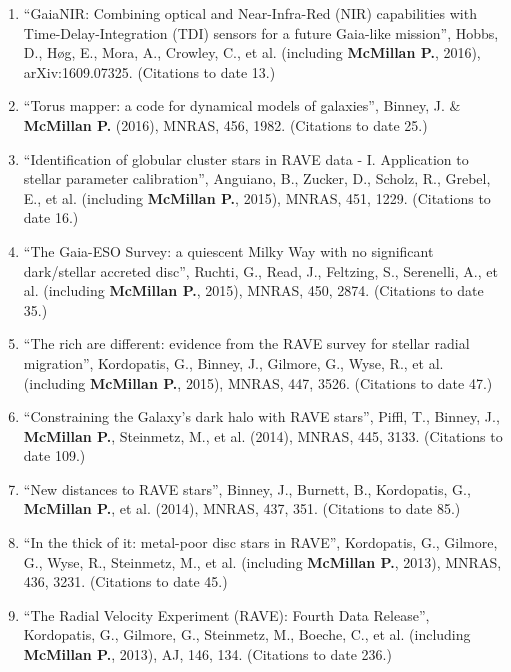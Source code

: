 \documentclass{resume}
\begin{document}
\begin{enumerate}
\item ``GaiaNIR: Combining optical and Near-Infra-Red (NIR) capabilities with Time-Delay-Integration (TDI) sensors for a future Gaia-like mission'', Hobbs, D., H{\o}g, E., Mora, A., Crowley, C., et al. (including \textbf{McMillan P.}, 2016), arXiv:1609.07325. (Citations to date 13.)

\item ``Torus mapper: a code for dynamical models of galaxies'', Binney, J. \& \textbf{McMillan P.} (2016), MNRAS, 456, 1982. (Citations to date 25.)

\item ``Identification of globular cluster stars in RAVE data - I. Application to stellar parameter calibration'', Anguiano, B., Zucker, D., Scholz, R., Grebel, E., et al. (including \textbf{McMillan P.}, 2015), MNRAS, 451, 1229. (Citations to date 16.)

\item ``The Gaia-ESO Survey: a quiescent Milky Way with no significant dark/stellar accreted disc'', Ruchti, G., Read, J., Feltzing, S., Serenelli, A., et al. (including \textbf{McMillan P.}, 2015), MNRAS, 450, 2874. (Citations to date 35.)

\item ``The rich are different: evidence from the RAVE survey for stellar radial migration'', Kordopatis, G., Binney, J., Gilmore, G., Wyse, R., et al. (including \textbf{McMillan P.}, 2015), MNRAS, 447, 3526. (Citations to date 47.)

\item ``Constraining the Galaxy's dark halo with RAVE stars'', Piffl, T., Binney, J., \textbf{McMillan P.}, Steinmetz, M., et al. (2014), MNRAS, 445, 3133. (Citations to date 109.)

\item ``New distances to RAVE stars'', Binney, J., Burnett, B., Kordopatis, G., \textbf{McMillan P.}, et al. (2014), MNRAS, 437, 351. (Citations to date 85.)

\item ``In the thick of it: metal-poor disc stars in RAVE'', Kordopatis, G., Gilmore, G., Wyse, R., Steinmetz, M., et al. (including \textbf{McMillan P.}, 2013), MNRAS, 436, 3231. (Citations to date 45.)

\item ``The Radial Velocity Experiment (RAVE): Fourth Data Release'', Kordopatis, G., Gilmore, G., Steinmetz, M., Boeche, C., et al. (including \textbf{McMillan P.}, 2013), AJ, 146, 134. (Citations to date 236.)


\end{enumerate}
\end{document}
